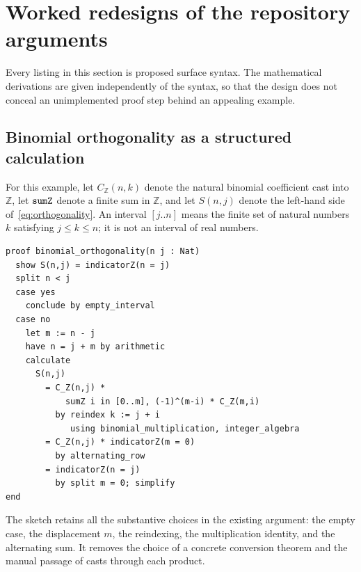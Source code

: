 \documentclass[11pt,a4paper]{article}
\newcommand{\code}[1]{\texttt{\detokenize{#1}}}
\newcommand{\Z}{\mathbb Z}
\theoremstyle{remark}
\begin{document}
\section{Worked redesigns of the repository arguments}
\label{sec:worked}
Every listing in this section is proposed surface syntax. The mathematical derivations are given independently of the syntax, so that the design does not conceal an unimplemented proof step behind an appealing example.

\subsection{Binomial orthogonality as a structured calculation}
For this example, let $C_{\Z}(n,k)$ denote the natural binomial coefficient cast into $\Z$, let $\code{sumZ}$ denote a finite sum in $\Z$, and let $S(n,j)$ denote the left-hand side of~\eqref{eq:orthogonality}. An interval $[j..n]$ means the finite set of natural numbers $k$ satisfying $j\leq k\leq n$; it is not an interval of real numbers.
\par\noindent\begin{minipage}{\linewidth}
\begin{lstlisting}[caption={Proposed Motive sketch of binomial orthogonality.}]
proof binomial_orthogonality(n j : Nat)
  show S(n,j) = indicatorZ(n = j)
  split n < j
  case yes
    conclude by empty_interval
  case no
    let m := n - j
    have n = j + m by arithmetic
    calculate
      S(n,j)
        = C_Z(n,j) *
            sumZ i in [0..m], (-1)^(m-i) * C_Z(m,i)
          by reindex k := j + i
             using binomial_multiplication, integer_algebra
        = C_Z(n,j) * indicatorZ(m = 0)
          by alternating_row
        = indicatorZ(n = j)
          by split m = 0; simplify
end
\end{lstlisting}
\end{minipage}\par
The sketch retains all the substantive choices in the existing argument: the empty case, the displacement $m$, the reindexing, the multiplication identity, and the alternating sum. It removes the choice of a concrete \code{Finset} conversion theorem and the manual passage of casts through each product.
\end{document}
